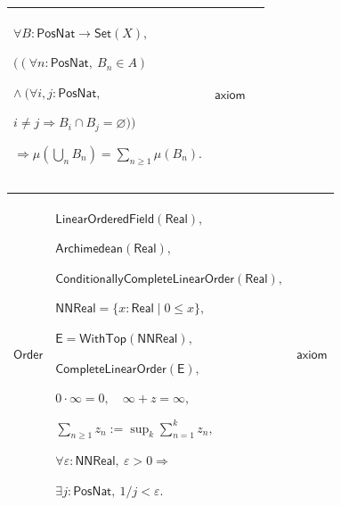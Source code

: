 \documentclass[11pt]{amsart}
\newlength{\FTCThreeColumnBody}
\begin{document}
{\begin{tabular}{|@{}>{\centering\arraybackslash}m{0.251968\FTCThreeColumnBody}|>{\centering\arraybackslash}m{0.590551\FTCThreeColumnBody}|>{\centering\arraybackslash}m{0.157480\FTCThreeColumnBody}|}
$\displaystyle \forall B:\textsf{PosNat}\to\textsf{Set}(X),$\par
$\displaystyle \bigl((\forall n:\textsf{PosNat},\ B_n\in A)$\par
$\displaystyle \land\ (\forall i,j:\textsf{PosNat},$\par
$\displaystyle i\ne j\Rightarrow B_i\cap B_j=\varnothing)\bigr)$\par
$\displaystyle \Rightarrow\mu(\bigcup_n B_n)=\sum_{n\ge1}\mu(B_n).$ & $\displaystyle \textsf{axiom}$\\ \hline
\end{tabular}%
\par\setlength{\parskip}{0pt}\nointerlineskip
\noindent
\begin{tabular}{|@{}>{\centering\arraybackslash}m{0.251968\FTCThreeColumnBody}|>{\centering\arraybackslash}m{0.590551\FTCThreeColumnBody}|>{\centering\arraybackslash}m{0.157480\FTCThreeColumnBody}|}\hline
\hypertarget{ax:Order}{$\displaystyle \textsf{Order}$} & $\displaystyle \textsf{LinearOrderedField}(\textsf{Real}),$\par
$\displaystyle \textsf{Archimedean}(\textsf{Real}),$\par
$\displaystyle \textsf{ConditionallyCompleteLinearOrder}(\textsf{Real}),$\par
$\displaystyle \textsf{NNReal}=\{x:\textsf{Real}\mid0\le x\},$\par
$\displaystyle \textsf{E}=\textsf{WithTop}(\textsf{NNReal}),$\par
$\displaystyle \textsf{CompleteLinearOrder}(\textsf{E}),$\par
$\displaystyle 0\cdot\infty=0,\quad\infty+z=\infty,$\par
$\displaystyle \sum_{n\ge1}z_n:=\sup_k\sum_{n=1}^kz_n,$\par
$\displaystyle \forall\varepsilon:\textsf{NNReal},\ \varepsilon>0\Rightarrow$\par
$\displaystyle \exists j:\textsf{PosNat},\ 1/j<\varepsilon.$ & $\displaystyle \textsf{axiom}$\\ \hline
\end{tabular}%
\par
}
\end{document}
